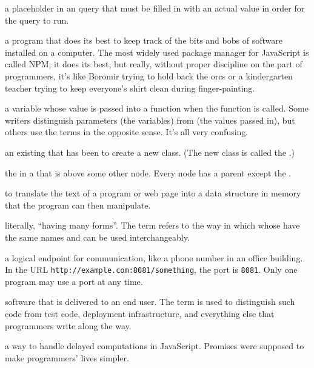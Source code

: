 \begin{description}
a placeholder in an  query that must be filled in with an actual
value in order for the query to run.

a program that does its best to keep track of the bits and bobs of software
installed on a computer. The most widely used package manager for JavaScript
is called NPM; it does its best, but really, without proper discipline on the
part of programmers, it's like Boromir trying to hold back the orcs or a
kindergarten teacher trying to keep everyone's shirt clean during
finger-painting.

a variable whose value is passed into a function when the function is called.
Some writers distinguish parameters (the variables) from
 (the values passed in), but others use the terms in
the opposite sense. It's all very confusing.

an existing  that has been  to create a
new class. (The new class is called the .)

the  in a  that is above some other node. Every
node has a parent except the .

to translate the text of a program or web page into a data structure in memory
that the program can then manipulate.

literally, ``having many forms''. The term refers to the way in which
 whose  have the same names and
 can be used interchangeably.

a logical endpoint for communication, like a phone number in an office
building. In the URL \texttt{http://example.com:8081/something}, the port is \texttt{8081}.
Only one program may use a port at any time.

software that is delivered to an end user. The term is used to distinguish
such code from test code, deployment infrastructure, and everything else that
programmers write along the way.

a way to handle delayed computations in JavaScript. Promises were supposed to
make programmers' lives simpler.


\end{description}
